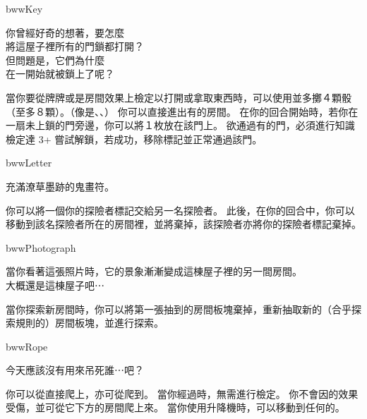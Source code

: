 \begin{OmenCard}{bww}{Key}{}
  \begin{CardStory}
    你曾經好奇的想著，要怎麼\\
    將這屋子裡所有的門鎖都打開？\\
    但問題是，它們為什麼\\
    在一開始就被鎖上了呢？
  \end{CardStory}
  \footnotesize
  當你要從牌牌或是房間效果上檢定以打開或拿取東西時，可以使用\ThisName{}並多擲４顆骰（至多８顆）。（像是、、）\smallbreak
  你可以直接進出有的房間。\smallbreak
  在你的回合開始時，若你在一扇未上鎖的門旁邊，你可以將１枚放在該門上。\smallbreak
  欲通過有的門，必須進行知識檢定達 3+ 嘗試解鎖，若成功，移除標記並正常通過該門。
\end{OmenCard}%
\linebreak[0]%
\begin{OmenCard}{bww}{Letter}{}
  \begin{CardStory}
    充滿潦草墨跡的鬼畫符。
  \end{CardStory}
  你可以將一個你的探險者標記交給另一名探險者。\smallbreak
  此後，在你的回合中，你可以移動到該名探險者所在的房間裡，並將\ThisName{}棄掉，該探險者亦將你的探險者標記棄掉。\smallbreak
\end{OmenCard}%
\linebreak[0]%
\begin{OmenCard}{bww}{Photograph}{}
  \begin{CardStory}
    當你看著這張照片時，它的景象漸漸變成這棟屋子裡的另一間房間。\\
    大概還是這棟屋子吧⋯
  \end{CardStory}
  當你探索新房間時，你可以將第一張抽到的房間板塊棄掉，重新抽取新的（合乎探索規則的）房間板塊，並進行探索。\smallbreak
\end{OmenCard}%
\linebreak[0]%
\begin{OmenCard}{bww}{Rope}{}
  \begin{CardStory}
    今天應該沒有用來吊死誰⋯吧？
  \end{CardStory}
  你可以從直接爬上，亦可從爬到。\smallbreak
  當你經過時，無需進行檢定。\smallbreak
  你不會因的效果受傷，並可從它下方的房間爬上來。\smallbreak
  當你使用升降機時，可以移動到任何的。\smallbreak
\end{OmenCard}%
\linebreak[0]%
